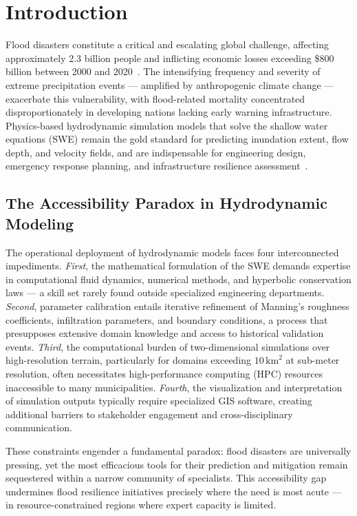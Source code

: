 \documentclass[11pt, a4paper]{article}
\begin{document}
\normalsize

\section{Introduction}
\label{sec:intro}

Flood disasters constitute a critical and escalating global challenge, affecting approximately 2.3 billion people and inflicting economic losses exceeding \$800 billion between 2000 and 2020~\cite{unisdr2020}. The intensifying frequency and severity of extreme precipitation events --- amplified by anthropogenic climate change --- exacerbate this vulnerability, with flood-related mortality concentrated disproportionately in developing nations lacking early warning infrastructure. Physics-based hydrodynamic simulation models that solve the shallow water equations (SWE) remain the gold standard for predicting inundation extent, flow depth, and velocity fields, and are indispensable for engineering design, emergency response planning, and infrastructure resilience assessment~\cite{bates2010}.

\subsection{The Accessibility Paradox in Hydrodynamic Modeling}

The operational deployment of hydrodynamic models faces four interconnected impediments. \emph{First}, the mathematical formulation of the SWE demands expertise in computational fluid dynamics, numerical methods, and hyperbolic conservation laws --- a skill set rarely found outside specialized engineering departments. \emph{Second}, parameter calibration entails iterative refinement of Manning's roughness coefficients, infiltration parameters, and boundary conditions, a process that presupposes extensive domain knowledge and access to historical validation events. \emph{Third}, the computational burden of two-dimensional simulations over high-resolution terrain, particularly for domains exceeding $10\,\mathrm{km}^2$ at sub-meter resolution, often necessitates high-performance computing (HPC) resources inaccessible to many municipalities. \emph{Fourth}, the visualization and interpretation of simulation outputs typically require specialized GIS software, creating additional barriers to stakeholder engagement and cross-disciplinary communication.

These constraints engender a fundamental paradox: flood disasters are universally pressing, yet the most efficacious tools for their prediction and mitigation remain sequestered within a narrow community of specialists. This accessibility gap undermines flood resilience initiatives precisely where the need is most acute --- in resource-constrained regions where expert capacity is limited.
\end{document}

